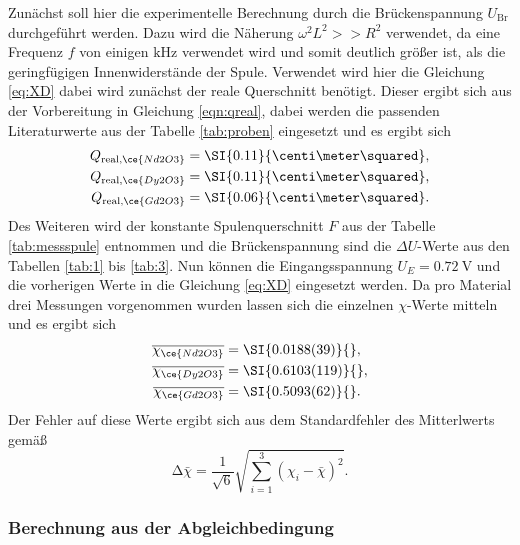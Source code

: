 Zunächst soll hier die experimentelle Berechnung durch die Brückenspannung $U_{\text{Br}}$ durchgeführt werden. Dazu wird die Näherung
$\omega^2 L^2 >> R^2$ verwendet, da eine Frequenz $f$ von einigen $\si{\kilo\hertz}$ verwendet wird und somit deutlich größer ist, als die geringfügigen Innenwiderstände der Spule.
Verwendet wird hier die Gleichung \eqref{eq:XD} dabei wird zunächst der reale Querschnitt benötigt. Dieser ergibt sich aus der Vorbereitung in Gleichung \eqref{eqn:qreal}, dabei werden die passenden Literaturwerte aus der Tabelle
\ref{tab:proben} eingesetzt und es ergibt sich
\begin{align}
    \label{eqn:11}
    Q_{\text{real,}\ce{Nd2O3}} &= \SI{0.11}{\centi\meter\squared},\\
    \label{eqn:12}
    Q_{\text{real,}\ce{Dy2O3}} &= \SI{0.11}{\centi\meter\squared},\\
    \label{eqn:13}
    Q_{\text{real,}\ce{Gd2O3}} &= \SI{0.06}{\centi\meter\squared}.
\end{align}
Des Weiteren wird der konstante Spulenquerschnitt $F$ aus der Tabelle \ref{tab:messspule} entnommen und die Brückenspannung sind die $\Delta U$-Werte aus den Tabellen \ref{tab:1} bis \ref{tab:3}. Nun können die Eingangsspannung $U_E = \SI{0.72}{\volt}$ und die vorherigen Werte in die Gleichung \eqref{eq:XD} eingesetzt werden.
Da pro Material drei Messungen vorgenommen wurden lassen sich die einzelnen $\chi$-Werte mitteln und es ergibt sich
\begin{align*}
    \overline{\chi_{\ce{Nd2O3}}} &= \SI{0.0188(39)}{},\\
    \overline{\chi_{\ce{Dy2O3}}} &= \SI{0.6103(119)}{},\\
    \overline{\chi_{\ce{Gd2O3}}} &= \SI{0.5093(62)}{}.
\end{align*}
Der Fehler auf diese Werte ergibt sich aus dem Standardfehler des Mitterlwerts gemäß
\begin{equation*}
    \increment \bar{\chi} = \frac{1}{\sqrt{6}} \sqrt{\sum_{i=1}^{3} (\chi_{i} -\bar{\chi})^2 }.
\end{equation*}

\subsubsection{Berechnung aus der Abgleichbedingung}

